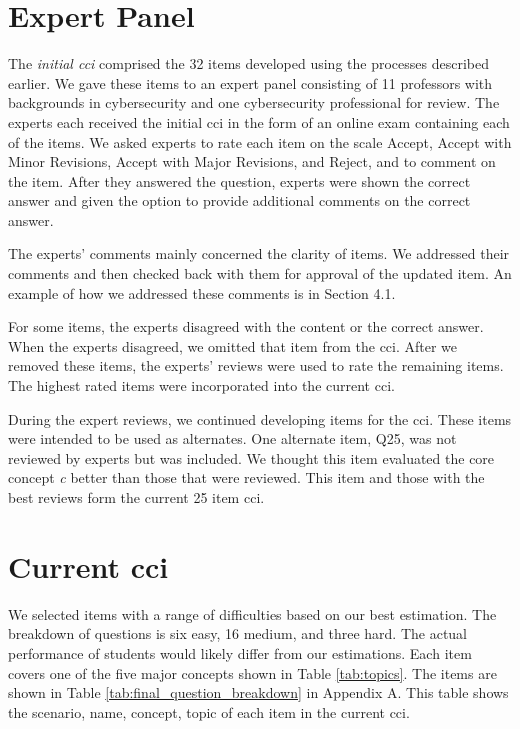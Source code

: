 \section{Expert Panel}


The \emph{initial \gls{cci}} comprised the 32 items developed using the processes described earlier. We gave these items to an expert panel consisting of 11 professors with backgrounds in cybersecurity and one cybersecurity professional for review. The experts each received the initial \gls{cci} in the form of an online exam containing each of the items. We asked experts to rate each item on the scale Accept, Accept with Minor Revisions, Accept with Major Revisions, and Reject, and to comment on the item. After they answered the question, experts were shown the correct answer and given the option to provide additional comments on the correct answer. 

\iflong

The experts' comments mainly concerned the clarity of items. We addressed their comments and then checked back with them for approval of the updated item. An example of how we addressed these comments is in Section 4.1. 

For some items, the experts disagreed with the content or the correct answer. When the experts disagreed, we omitted that item from the \gls{cci}. After we removed these items, the experts' reviews were used to rate the remaining items. The highest rated items were incorporated into the current \gls{cci}.

During the expert reviews, we continued developing items for the \gls{cci}. These items were intended to be used as alternates. One alternate item, Q25, was not reviewed by experts but was included. We thought this item evaluated the core concept \textit{\gls{c}} better than those that were reviewed. This item and those with the best reviews form the current 25 item \gls{cci}.

\fi


\section{Current \gls{cci}}

We selected items with a range of difficulties based on our best estimation. The breakdown of questions is six easy, 16 medium, and three hard. The actual performance of students would likely differ from our estimations. Each item covers one of the five major concepts shown in Table \ref{tab:topics}. \iflong The items are shown in Table \ref{tab:final_question_breakdown} in Appendix A. This table shows the scenario, name, concept, topic of each item in the current \gls{cci}.\fi  



